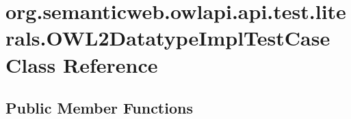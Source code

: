 \hypertarget{classorg_1_1semanticweb_1_1owlapi_1_1api_1_1test_1_1literals_1_1_o_w_l2_datatype_impl_test_case}{\section{org.\-semanticweb.\-owlapi.\-api.\-test.\-literals.\-O\-W\-L2\-Datatype\-Impl\-Test\-Case Class Reference}
\label{classorg_1_1semanticweb_1_1owlapi_1_1api_1_1test_1_1literals_1_1_o_w_l2_datatype_impl_test_case}
}
\subsection*{Public Member Functions}
